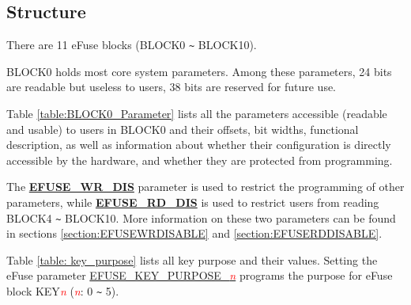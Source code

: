\documentclass[main\_\_EN.tex]{subfiles}
\begin{document}
\subsection{Structure}

There are 11 eFuse blocks (BLOCK0 \verb+~+ BLOCK10).

BLOCK0 holds most core system parameters. Among these parameters, 24 bits are readable but useless to users, 38 bits are reserved for future use.

Table \ref{table:BLOCK0_Parameter} lists all the parameters accessible (readable and usable) to users in BLOCK0 and their offsets, bit widths, functional description, as well as information about whether their configuration is directly accessible by the hardware, and whether they are protected from programming.

The {\bfseries \hyperref[fielddesc:EFUSEWRDIS]{EFUSE\_WR\_DIS}} parameter is used to restrict the programming of other parameters, while {\bfseries \hyperref[fielddesc:EFUSERDDIS]{EFUSE\_RD\_DIS}} is used to restrict users from reading BLOCK4 \verb+~+ BLOCK10. More information on these two parameters can be found in sections \ref{section:EFUSEWRDISABLE} and \ref{section:EFUSERDDISABLE}.

\clearpage
\begin{landscape}



\end{landscape}
\restoregeometry
\clearpage

Table \ref{table: key_purpose} lists all key purpose and their values. Setting the eFuse parameter \hyperref[fielddesc:EFUSEKEYPURPOSE3]{EFUSE\_KEY\_PURPOSE\_\textcolor{red}{\it{n}}} programs the purpose for eFuse block KEY\textcolor{red}{\it{n}} (\textcolor{red}{\it{n}}: 0 \verb+~+ 5).
\end{document}
